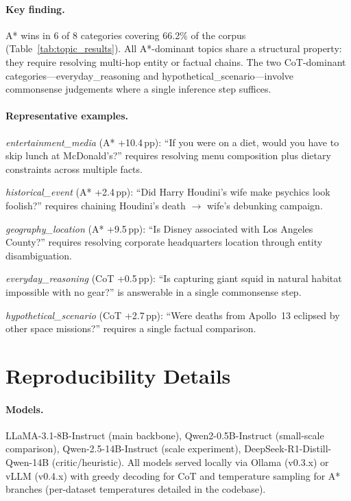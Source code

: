 \documentclass[11pt]{article}
\begin{document}
{\paragraph{Key finding.} A* wins in 6 of 8 categories covering 66.2\% of the corpus (Table~\ref{tab:topic_results}). All A*-dominant topics share a structural property: they require resolving multi-hop entity or factual chains. The two CoT-dominant categories---everyday\_reasoning and hypothetical\_scenario---involve commonsense judgements where a single inference step suffices.

\paragraph{Representative examples.}
\emph{entertainment\_media} (A* +10.4\,pp): ``If you were on a diet, would you have to skip lunch at McDonald's?'' requires resolving menu composition plus dietary constraints across multiple facts.

\emph{historical\_event} (A* +2.4\,pp): ``Did Harry Houdini's wife make psychics look foolish?'' requires chaining Houdini's death $\to$ wife's debunking campaign.

\emph{geography\_location} (A* +9.5\,pp): ``Is Disney associated with Los Angeles County?'' requires resolving corporate headquarters location through entity disambiguation.

\emph{everyday\_reasoning} (CoT +0.5\,pp): ``Is capturing giant squid in natural habitat impossible with no gear?'' is answerable in a single commonsense step.

\emph{hypothetical\_scenario} (CoT +2.7\,pp): ``Were deaths from Apollo~13 eclipsed by other space missions?'' requires a single factual comparison.

\section{Reproducibility Details}
\label{app:reproducibility}

\paragraph{Models.} LLaMA-3.1-8B-Instruct (main backbone), Qwen2-0.5B-Instruct (small-scale comparison), Qwen-2.5-14B-Instruct (scale experiment), DeepSeek-R1-Distill-Qwen-14B (critic/heuristic). All models served locally via Ollama (v0.3.x) or vLLM (v0.4.x) with greedy decoding for CoT and temperature sampling for A* branches (per-dataset temperatures detailed in the codebase).

}
\end{document}
